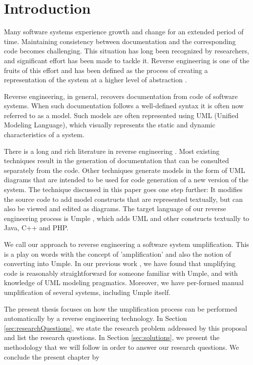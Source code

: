 \chapter{Introduction}

Many software systems experience growth and change for an extended period of time. Maintaining consistency between documentation and the corresponding code becomes challenging. This situation has long been recognized by researchers, and significant effort has been made to tackle it. Reverse engineering is one of the fruits of this effort and has been defined as the process of creating a representation of the system at a higher level of abstraction \cite{Chikofsky}.

Reverse engineering, in general, recovers documentation from code of software systems. When such documentation follows a well-defined syntax it is often now referred to as a model.  Such models are often represented using UML (Unified Modeling Language), which visually represents the static and dynamic characteristics of a system. 

There is a long and rich literature in reverse engineering \cite{CanforaHarman2007}. Most existing techniques result in the generation of documentation that can be consulted separately from the code. Other techniques generate models in the form of UML diagrams that are intended to be used for code generation of a new version of the system. The technique discussed in this paper goes one step further: It modifies the source code to add model constructs that are represented textually, but can also be viewed and edited as diagrams. The target language of our reverse engineering process is Umple \cite{UmpleMAIN}, which adds UML and other constructs textually to Java, C++ and PHP.

We call our approach to reverse engineering a software system umplification. This is a play on words with the concept of 'amplification' and also the notion of converting into Umple. In our previous work \cite{Lethbridge2010c}, we have found that umplifying code is reasonably straightforward for someone familiar with Umple, and with knowledge of UML modeling pragmatics. Moreover, we have per-formed manual umplification of several systems, including Umple itself. 

The present thesis focuses on how the umplification process can be performed automatically by a reverse engineering technology. In Section \ref{sec:researchQuestions}, we state the research problem addressed by this proposal and list the research questions. In Section \ref{sec:solutions}, we present the methodology that we will follow in order to answer our research questions. We conclude the present chapter by

